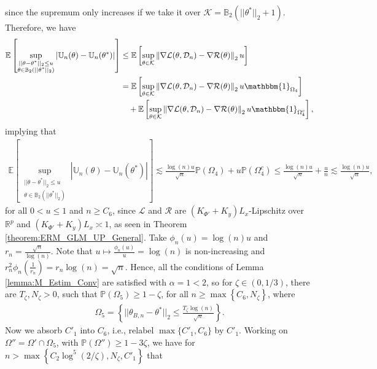 \documentclass{article}
\begin{document}
since the supremum only increases if we take it over $\mathcal{K} = \mathbb{B}_2(||\theta^*||_2 + 1)$. Therefore, we have
\begin{align*}
\mathbb{E}\left[\mathop{\sup}_{\substack{||\theta - \theta^*||_2 \leq u\\\theta \in \mathbb{B}_2(||\theta^*||_2)}}\left|\mathbb{U}_n(\theta) - \mathbb{U}_n(\theta^*)\right|\right] &\leq \mathbb{E}\left[\mathop{\sup}\limits_{\theta \in \mathcal{K}}\left\|\nabla\mathcal{L}(\theta, \mathcal{D}_n) - \nabla\mathcal{R}(\theta)\right\|_2u\right]\\
&= \mathbb{E}\left[\mathop{\sup}\limits_{\theta \in \mathcal{K}}\left\|\nabla\mathcal{L}(\theta, \mathcal{D}_n) - \nabla\mathcal{R}(\theta)\right\|_2u\mathbbm{1}_{\Omega_4}\right]\\
& \quad + \mathbb{E}\left[\mathop{\sup}\limits_{\theta \in \mathcal{K}}\left\|\nabla\mathcal{L}(\theta, \mathcal{D}_n) - \nabla\mathcal{R}(\theta)\right\|_2u\mathbbm{1}_{\Omega_4^c}\right],
\end{align*}
implying that
\begin{align*}
\mathbb{E}\left[\mathop{\sup}_{\substack{||\theta - \theta^*||_2 \leq u\\ \theta \in \mathbb{B}_2(||\theta^*||_2)}}\left|\mathbb{U}_n(\theta) - \mathbb{U}_n(\theta^*)\right|\right] \lesssim \frac{\log(n)u}{\sqrt{n}}\mathbb{P}(\Omega_4) + u\mathbb{P}(\Omega_4^c) \leq \frac{\log(n)u}{\sqrt{n}} + \frac{u}{n} \lesssim \frac{\log(n)u}{\sqrt{n}},
\end{align*}
for all $0 < u \leq 1$ and $n \geq C_6$, since $\mathcal{L}$ and $\mathcal{R}$ are $(K_{\Phi'} + K_y)L_x$-Lipschitz over $\mathbb{R}^p$ and $(K_{\Phi'} + K_y)L_x \asymp 1$, as seen in Theorem \ref{theorem:ERM_GLM_UP_General}. Take $\phi_n(u) = \log(n)u$ and $r_n = \frac{\sqrt{n}}{\log(n)}$. Note that $u \mapsto \frac{\phi_n(u)}{u} = \log(n)$ is non-increasing and $r_n^2\phi_n\left(\frac{1}{r_n}\right) = r_n\log(n) = \sqrt{n}$. Hence, all the conditions of Lemma \ref{lemma:M_Estim_Conv} are satisfied with $\alpha = 1 < 2$, so for $\zeta \in (0, 1/3)$, there are $T_\zeta, N_\zeta > 0$, such that $\mathbb{P}(\Omega_5) \geq 1 - \zeta$, for all $n \geq \max\left\{C_6, N_\zeta\right\}$, where 
\begin{align*}
\Omega_5 = \left\{||\theta_{B, n} - \theta^*||_2 \leq \frac{T_\zeta\log(n)}{\sqrt{n}}\right\}.
\end{align*}
Now we absorb $C'_1$ into $C_6$, i.e., relabel $\max\{C'_1, C_6\}$ by $C'_1$. Working on $\Omega'' = \Omega' \cap \Omega_5$, with $\mathbb{P}(\Omega'') \geq 1 - 3\zeta$, we have for $n > \max\left\{C_2\log^5(2/\zeta), N_\zeta, C'_1\right\}$ that 
\end{document}
